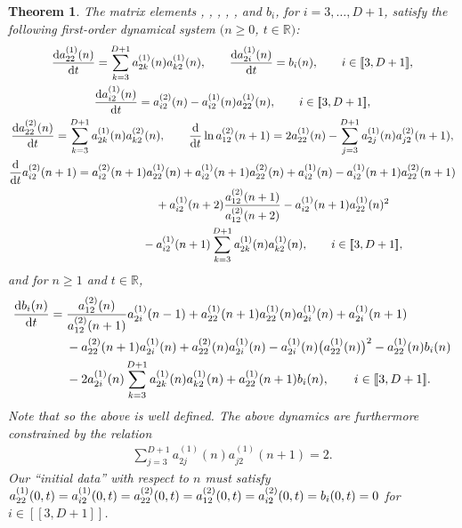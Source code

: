 \documentclass[pdftex]{sigma}
\numberwithin{equation}{section}
\newtheorem{Theorem}{Theorem}[section]
\begin{document}
\begin{Theorem}\label{skewtoda} The matrix elements , , , , ,  and $b_i$, for $i=3, \dots, D+1$, satisfy the following first-order dynamical system $(n \geq 0$, $t \in \mathbb{R})$:
\begin{gather*}
\frac{{\rm d} a_{22}^{(1)}(n) }{{\rm d}t} = \sum_{k=3}^{D+1} a_{2k}^{(1)}(n) a_{k2}^{(1)}(n) ,\qquad
\frac{{\rm d} a_{2i}^{(1)}(n)}{{\rm d}t} = b_i(n),\qquad i \in [\![3, D+1]\!], \\
\frac{{\rm d} a_{i2}^{(1)}(n)}{{\rm d}t} = a_{i2}^{(2)}(n) - a_{i2}^{(1)}(n) a_{22}^{(1)}(n),\qquad i \in [\![ 3, D+1]\!], \\
\frac{{\rm d} a_{22}^{(2)}(n)}{{\rm d}t} = \sum_{k=3}^{D+1} a_{2k}^{(1)}(n)a_{k2}^{(2)}(n), \qquad
 \frac{{\rm d}}{{\rm d}t} \ln a_{12}^{(2)}(n+1) =2a_{22}^{(1)}(n) -\sum_{j=3}^{D+1} a_{2j}^{(1)}(n)a_{j2}^{(2)}(n+1), \\
\frac{{\rm d}}{{\rm d}t}a_{i2}^{(2)}(n+1) = a_{i2}^{(2)}(n+1) a_{22}^{(1)}(n) + a_{i2}^{(1)}(n+1)a_{22}^{(2)}(n)+ a_{i2}^{(1)}(n) - a_{i2}^{(1)}(n+1) a_{22}^{(2)}(n+1) \\
\phantom{\frac{{\rm d}}{{\rm d}t}a_{i2}^{(2)}(n+1) =}{} + a_{i2}^{(1)}(n+2)\frac{ a_{12}^{(2)}(n+1)}{a_{12}^{(2)}(n+2)} - a_{i2}^{(1)}(n+1) a_{22}^{(1)}(n)^2 \\
\phantom{\frac{{\rm d}}{{\rm d}t}a_{i2}^{(2)}(n+1) =}{} - a_{i2}^{(1)}(n+1) \sum_{k=3}^{D+1} a_{2k}^{(1)}(n) a_{k2}^{(1)}(n),\qquad i \in [\![3, D+1]\!] ,
\end{gather*}
and for $n \geq 1$ and $t \in \mathbb{R}$,
\begin{align*}
\frac{{\rm d} b_i(n)}{{\rm d}t} ={}& \frac{a_{12}^{(2)}(n) }{a_{12}^{(2)}(n+1)}a_{2i}^{(1)}(n-1) + a_{22}^{(1)}(n+1) a_{22}^{(1)}(n) a_{2i}^{(1)}(n) + a_{2i}^{(1)}(n+1) \\
& -a_{22}^{(2)}(n+1)a_{2i}^{(1)}(n)+ a_{22}^{(2)}(n) a_{2i}^{(1)}(n) -a_{2i}^{(1)}(n) \big( a_{22}^{(1)}(n) \big)^2 - a_{22}^{(1)}(n) b_i(n)\\
& - 2 a_{2i}^{(1)}(n) \sum_{k=3}^{D+1}a_{2k}^{(1)}(n) a_{k2}^{(1)}(n) + a_{22}^{(1)}(n+1) b_i(n), \qquad i \in [\![3, D+1]\!].
\end{align*}
Note that  so the above is well defined. The above dynamics are furthermore constrained by the relation
\begin{align}\label{identity}
\sum_{j=3}^{D+1} a_{2j}^{(1)}(n) a_{j2}^{(1)}(n+1) = 2.
\end{align}
Our \enquote{initial data} with respect to $n$ must satisfy $\smash{a_{22}^{(1)}(0,t) = a_{i2}^{(1)}(0,t) = a_{22}^{(2)}(0,t) = a_{12}^{(2)}(0,t)} =\smash{ a_{i2}^{(2)}(0,t) = b_i(0,t)=0}$ for $i \in [\![ 3, D+1]\!]$.
\end{Theorem}
\end{document}
